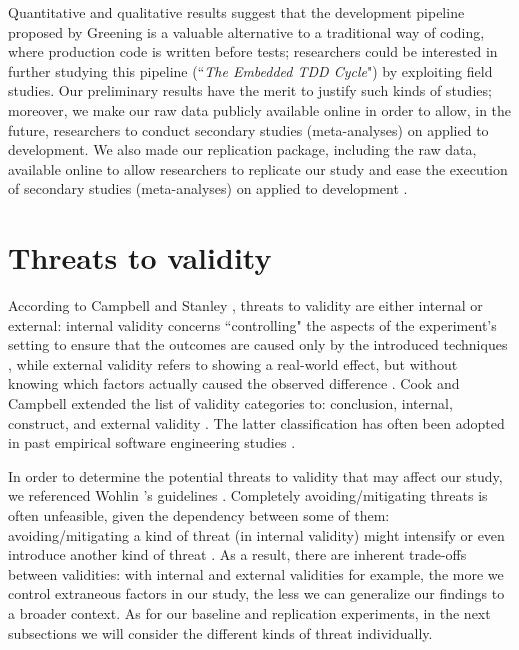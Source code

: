 Quantitative and qualitative results suggest that the development pipeline proposed by Greening\cite{TDDEC} is a valuable alternative to a traditional way of coding, where production code is written before tests; researchers could be interested in further studying this pipeline (\ie ``\textit{The Embedded TDD Cycle}") by exploiting field studies. 
Our preliminary results have the merit to justify such kinds of studies; moreover, we make our raw data publicly available online in order to allow, in the future, researchers to conduct secondary studies (\eg meta-analyses) on \tdd applied to \ess development.
We also made our replication package, including the raw data, available online to allow researchers to replicate our study and ease the execution of secondary studies (\eg meta-analyses) on \tdd applied to \ess development \cite{RepPackage}.





\section{Threats to validity}
According to Campbell and Stanley \cite{ResearchOfTeaching}, threats to validity are either internal or external: internal validity concerns ``controlling" the aspects of the experiment's setting to ensure that the outcomes are caused only by the introduced techniques \cite{DBLP:conf/icse/SiegmundSA15}, while external validity refers to showing a real-world effect, but without knowing which factors actually caused the observed difference \cite{DBLP:conf/icse/SiegmundSA15}.
Cook and Campbell extended the list of validity categories to: conclusion, internal, construct, and external validity \cite{QuasiExp}. The latter classification has often been adopted in past empirical software engineering studies \cite{DBLP:books/sp/WohlinRHOR00}. 

In order to determine the potential threats to validity that may affect our study, we referenced Wohlin \etal's guidelines \cite{DBLP:books/sp/WohlinRHOR00}.
Completely avoiding/mitigating threats is often unfeasible, given the dependency between some of them: avoiding/mitigating a kind of threat (\ie in internal validity) might intensify or even introduce another kind of threat \cite{DBLP:books/sp/WohlinRHOR00}. As a result, there are inherent trade-offs between validities: with internal and external validities for example, the more we control extraneous factors in our study, the less we can generalize our findings to a broader context. As for our baseline and replication experiments, in the next subsections we will consider the different kinds of threat individually.

